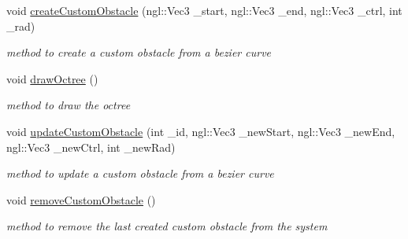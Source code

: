 \begin{DoxyCompactItemize}
void \hyperlink{classWorld_a39304ac5c19557a9bea6be92c2f643d2}{createCustomObstacle} (ngl::Vec3 \_\-start, ngl::Vec3 \_\-end, ngl::Vec3 \_\-ctrl, int \_\-rad)
\begin{DoxyCompactList}\small\item\em method to create a custom obstacle from a bezier curve \item\end{DoxyCompactList}\item 
void \hyperlink{classWorld_a7123d3ffafa97f55950368dca30953a6}{drawOctree} ()
\begin{DoxyCompactList}\small\item\em method to draw the octree \item\end{DoxyCompactList}\item 
void \hyperlink{classWorld_a0eacd7939c104da33aa14bed6667a193}{updateCustomObstacle} (int \_\-id, ngl::Vec3 \_\-newStart, ngl::Vec3 \_\-newEnd, ngl::Vec3 \_\-newCtrl, int \_\-newRad)
\begin{DoxyCompactList}\small\item\em method to update a custom obstacle from a bezier curve \item\end{DoxyCompactList}\item 
void \hyperlink{classWorld_a678be12ee2c2754abb91639610115fa2}{removeCustomObstacle} ()
\begin{DoxyCompactList}\small\item\em method to remove the last created custom obstacle from the system \item\end{DoxyCompactList}\end{DoxyCompactItemize}
